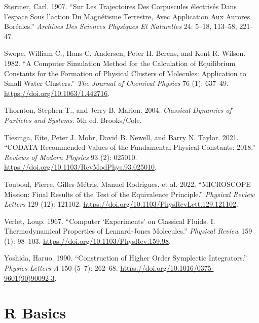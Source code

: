 \documentclass[
  10.5pt,
  letterpaper,
]{scrbook}
\newlength{\cslhangindent}
\newenvironment{CSLReferences}[2] %
 {\begin{list}{}{%
  \setlength{\itemindent}{0pt}
  \setlength{\leftmargin}{0pt}
  \setlength{\parsep}{0pt}
  \ifodd #1
   \setlength{\leftmargin}{\cslhangindent}
   \setlength{\itemindent}{-1\cslhangindent}
  \fi
  \setlength{\itemsep}{#2\baselineskip}}}
 {\end{list}}
\theoremstyle{plain}
\theoremstyle{remark}
\begin{document}
\begin{CSLReferences}{1}{1}
Størmer, Carl. 1907. {``Sur Les Trajectoires Des Corpuscules
{é}lectris{é}s Dans l'espace Sous l'action Du Magn{é}tisme Terrestre,
Avec Application Aux Aurores Bor{é}ales.''} \emph{Archives Des Sciences
Physiques Et Naturelles} 24: 5--18, 113--58, 221--47.

Swope, William C., Hans C. Andersen, Peter H. Berens, and Kent R.
Wilson. 1982. {``A Computer Simulation Method for the Calculation of
Equilibrium Constants for the Formation of Physical Clusters of
Molecules: Application to Small Water Clusters.''} \emph{The Journal of
Chemical Physics} 76 (1): 637--49.
\url{https://doi.org/10.1063/1.442716}.

Thornton, Stephen T., and Jerry B. Marion. 2004. \emph{Classical
Dynamics of Particles and Systems}. 5th ed. Brooks/Cole.

Tiesinga, Eite, Peter J. Mohr, David B. Newell, and Barry N. Taylor.
2021. {``{CODATA} Recommended Values of the Fundamental Physical
Constants: 2018.''} \emph{Reviews of Modern Physics} 93 (2): 025010.
\url{https://doi.org/10.1103/RevModPhys.93.025010}.

{Touboul, Pierre, Gilles Métris, Manuel Rodrigues, et al.} 2022.
{``{MICROSCOPE} Mission: Final Results of the Test of the Equivalence
Principle.''} \emph{Physical Review Letters} 129 (12): 121102.
\url{https://doi.org/10.1103/PhysRevLett.129.121102}.

Verlet, Loup. 1967. {``Computer {`Experiments'} on Classical Fluids.
{I}. {Thermodynamical} Properties of {Lennard-Jones} Molecules.''}
\emph{Physical Review} 159 (1): 98--103.
\url{https://doi.org/10.1103/PhysRev.159.98}.

Yoshida, Haruo. 1990. {``Construction of Higher Order Symplectic
Integrators.''} \emph{Physics Letters A} 150 (5--7): 262--68.
\url{https://doi.org/10.1016/0375-9601(90)90092-3}.

\end{CSLReferences}

\cleardoublepage
{}
{}
\appendix

\chapter{R Basics}\label{sec-r-basics}
\end{document}
